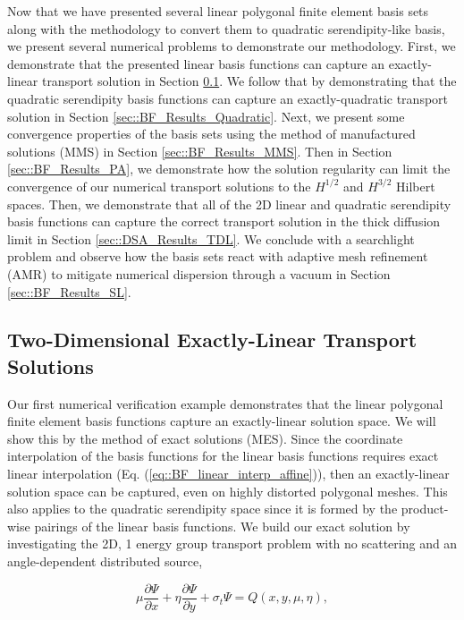 Now that we have presented several linear polygonal finite element basis sets along with the methodology to convert them to quadratic serendipity-like basis, we present several numerical problems to demonstrate our methodology. First, we demonstrate that the presented linear basis functions can capture an exactly-linear transport solution in Section \ref{sec::BF_Results_Linear}. We follow that by demonstrating that the quadratic serendipity basis functions can capture an exactly-quadratic transport solution in Section \ref{sec::BF_Results_Quadratic}. Next, we present some convergence properties of the basis sets using the method of manufactured solutions (MMS) in Section \ref{sec::BF_Results_MMS}. Then in Section \ref{sec::BF_Results_PA}, we demonstrate how the solution regularity can limit the convergence of our numerical transport solutions to the $H^{1/2}$ and $H^{3/2}$ Hilbert spaces. Then, we demonstrate that all of the 2D linear and quadratic serendipity basis functions can capture the correct transport solution in the thick diffusion limit in Section \ref{sec::DSA_Results_TDL}. We conclude with a searchlight problem and observe how the basis sets react with adaptive mesh refinement (AMR) to mitigate numerical dispersion through a vacuum in Section \ref{sec::BF_Results_SL}.

\subsection{Two-Dimensional Exactly-Linear Transport Solutions}
\label{sec::BF_Results_Linear}

Our first numerical verification example demonstrates that the linear polygonal finite element basis functions capture an exactly-linear solution space. We will show this by the method of exact solutions (MES). Since the coordinate interpolation of the basis functions for the linear basis functions requires exact linear interpolation (Eq. (\ref{eq::BF_linear_interp_affine})), then an exactly-linear solution space can be captured, even on highly distorted polygonal meshes. This also applies to the quadratic serendipity space since it is formed by the product-wise pairings of the linear basis functions. We build our exact solution by investigating the 2D, 1 energy group transport problem with no scattering and an angle-dependent distributed source,

\begin{equation}
\label{eq::BF_Results_Linear_angflux}
\mu \frac{\partial \Psi}{\partial x} + \eta \frac{\partial \Psi}{\partial y} + \sigma_t \Psi = Q(x,y, \mu, \eta), 
\end{equation}

